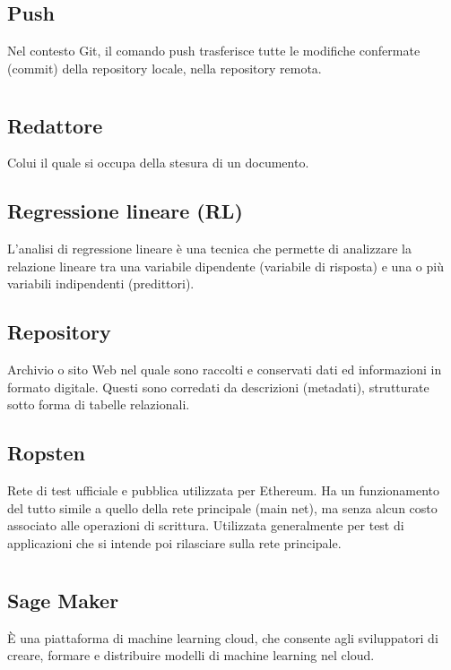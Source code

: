 	\subsection*{Push}
	Nel contesto Git, il comando push trasferisce tutte le modifiche confermate (commit) della repository locale, nella repository remota.
\pagebreak
\section[R]{}
	\subsection*{Redattore}
	Colui il quale si occupa della stesura di un documento.
	\subsection*{Regressione lineare (RL)}
	L'analisi di regressione lineare è una tecnica che permette di analizzare la relazione lineare tra una variabile dipendente (variabile di risposta) e una o più variabili indipendenti (predittori).
	\subsection*{Repository}
	Archivio o sito Web nel quale sono raccolti e conservati dati ed informazioni in formato digitale. Questi sono corredati da descrizioni (metadati), strutturate sotto forma di tabelle relazionali.
	\subsection*{Ropsten}
	Rete di test ufficiale e pubblica utilizzata per Ethereum. Ha un funzionamento del tutto simile a quello della rete principale (main net), ma senza alcun costo associato alle operazioni di scrittura. Utilizzata generalmente per test di applicazioni che si intende poi rilasciare sulla rete principale.
\pagebreak
\section[S]{}
	\subsection*{Sage Maker}
	È una piattaforma di machine learning cloud, che consente agli sviluppatori di creare, formare e distribuire modelli di machine learning nel cloud.
